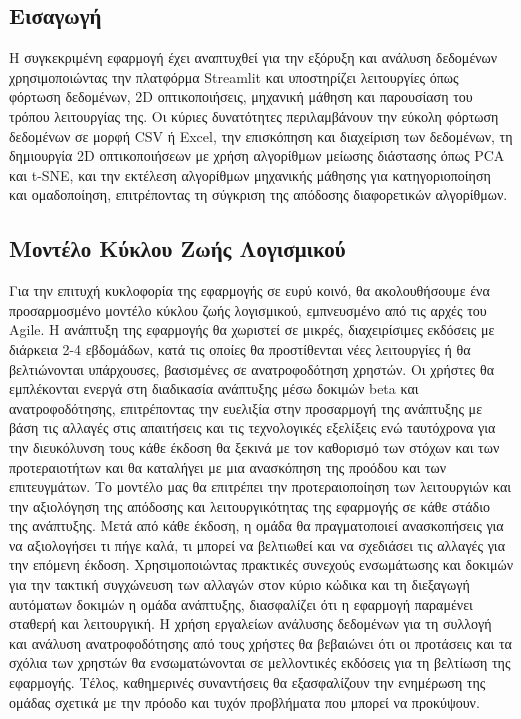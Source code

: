 \documentclass[a4paper,12pt]{article}
\begin{document}
\subsection{Εισαγωγή}
Η συγκεκριμένη εφαρμογή έχει αναπτυχθεί για την εξόρυξη και ανάλυση δεδομένων χρησιμοποιώντας την πλατφόρμα Streamlit και υποστηρίζει λειτουργίες όπως φόρτωση δεδομένων, 2D οπτικοποιήσεις, μηχανική μάθηση και παρουσίαση του τρόπου λειτουργίας της. Οι κύριες δυνατότητες περιλαμβάνουν την εύκολη φόρτωση δεδομένων σε μορφή CSV ή Excel, την επισκόπηση και διαχείριση των δεδομένων, τη δημιουργία 2D οπτικοποιήσεων με χρήση αλγορίθμων μείωσης διάστασης όπως PCA και t-SNE, και την εκτέλεση αλγορίθμων μηχανικής μάθησης για κατηγοριοποίηση και ομαδοποίηση, επιτρέποντας τη σύγκριση της απόδοσης διαφορετικών αλγορίθμων. 


\subsection{Μοντέλο Κύκλου Ζωής Λογισμικού}
Για την επιτυχή κυκλοφορία της εφαρμογής σε ευρύ κοινό, θα ακολουθήσουμε ένα προσαρμοσμένο μοντέλο κύκλου ζωής λογισμικού, εμπνευσμένο από τις αρχές του Agile. Η ανάπτυξη της εφαρμογής θα χωριστεί σε μικρές, διαχειρίσιμες εκδόσεις με διάρκεια 2-4 εβδομάδων, κατά τις οποίες θα προστίθενται νέες λειτουργίες ή θα βελτιώνονται υπάρχουσες, βασισμένες σε ανατροφοδότηση χρηστών. Οι χρήστες θα εμπλέκονται ενεργά στη διαδικασία ανάπτυξης μέσω δοκιμών beta και ανατροφοδότησης, επιτρέποντας την ευελιξία στην προσαρμογή της ανάπτυξης με βάση τις αλλαγές στις απαιτήσεις και τις τεχνολογικές εξελίξεις ενώ ταυτόχρονα για την διευκόλυνση τους κάθε έκδοση θα ξεκινά με τον καθορισμό των στόχων και των προτεραιοτήτων και θα καταλήγει με μια ανασκόπηση της προόδου και των επιτευγμάτων. Το μοντέλο μας θα επιτρέπει την προτεραιοποίηση των λειτουργιών και την αξιολόγηση της απόδοσης και λειτουργικότητας της εφαρμογής σε κάθε στάδιο της ανάπτυξης. Μετά από κάθε έκδοση, η ομάδα θα πραγματοποιεί ανασκοπήσεις για να αξιολογήσει τι πήγε καλά, τι μπορεί να βελτιωθεί και να σχεδιάσει τις αλλαγές για την επόμενη έκδοση. Χρησιμοποιώντας πρακτικές συνεχούς ενσωμάτωσης και δοκιμών για την τακτική συγχώνευση των αλλαγών στον κύριο κώδικα και τη διεξαγωγή αυτόματων δοκιμών η ομάδα ανάπτυξης, διασφαλίζει ότι η εφαρμογή παραμένει σταθερή και λειτουργική. Η χρήση εργαλείων ανάλυσης δεδομένων για τη συλλογή και ανάλυση ανατροφοδότησης από τους χρήστες θα βεβαιώνει ότι οι προτάσεις και τα σχόλια των χρηστών θα ενσωματώνονται σε μελλοντικές εκδόσεις για τη βελτίωση της εφαρμογής. Τέλος, καθημερινές συναντήσεις θα εξασφαλίζουν την ενημέρωση της ομάδας σχετικά με την πρόοδο και τυχόν προβλήματα που μπορεί να προκύψουν.
\end{document}
